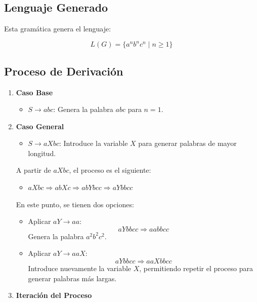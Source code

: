 \documentclass[12pt]{book} %
\providecommand{\tightlist}{%
  \setlength{\itemsep}{0pt}\setlength{\parskip}{0pt}}
\begin{document}
\hypertarget{lenguaje-generado-1}{%
\subsection{Lenguaje Generado}\label{lenguaje-generado-1}}

Esta gramática genera el lenguaje:

\[
L(G) = \{a^n b^n c^n \mid n \geq 1\}
\]

\hypertarget{proceso-de-derivaciuxf3n}{%
\subsection{Proceso de Derivación}\label{proceso-de-derivaciuxf3n}}

\begin{enumerate}
\def\labelenumi{\arabic{enumi}.}
\tightlist
\item
  \textbf{Caso Base}

  \begin{itemize}
  \tightlist
  \item
    \(S \to abc\): Genera la palabra \(abc\) para \(n = 1\).
  \end{itemize}
\item
  \textbf{Caso General}

  \begin{itemize}
  \tightlist
  \item
    \(S \to aXbc\): Introduce la variable \(X\) para generar palabras de
    mayor longitud.
  \end{itemize}

  A partir de \(aXbc\), el proceso es el siguiente:

  \begin{itemize}
  \tightlist
  \item
    \(aXbc \Rightarrow abXc \Rightarrow abYbcc \Rightarrow aYbbcc\)
  \end{itemize}

  En este punto, se tienen dos opciones:

  \begin{itemize}
  \item
    Aplicar \(aY \to aa\):\\
    \[
    aYbbcc \Rightarrow aabbcc
    \] Genera la palabra \(a^2b^2c^2\).
  \item
    Aplicar \(aY \to aaX\):\\
    \[
    aYbbcc \Rightarrow aaXbbcc
    \] Introduce nuevamente la variable \(X\), permitiendo repetir el
    proceso para generar palabras más largas.
  \end{itemize}
\item
  \textbf{Iteración del Proceso}


\end{enumerate}
\end{document}
